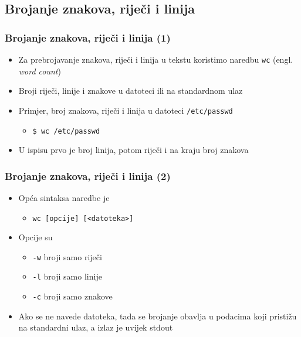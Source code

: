 \documentclass{beamer}
\newcommand{\shell}[1]{\texttt{#1}}
\begin{document}
\subsection{Brojanje znakova, riječi i linija}
\begin{frame}[t]
\frametitle{Brojanje znakova, riječi i linija (1)}
\begin{itemize}
  \item Za prebrojavanje znakova, riječi i linija u tekstu koristimo
        naredbu \shell{wc} (engl. \emph{word count})
  \item Broji riječi, linije i znakove u datoteci ili na standardnom ulaz
  \item Primjer, broj znakova, riječi i linija u datoteci
        \shell{/etc/passwd}
  \begin{itemize}
    \item[] \shell{\$ wc /etc/passwd}
  \end{itemize}
  \item U ispisu prvo je broj linija, potom riječi i na kraju broj znakova
\end{itemize}
\end{frame}

\begin{frame}[t]
\frametitle{Brojanje znakova, riječi i linija (2)}
\begin{itemize}
  \item Opća sintaksa naredbe je
  \begin{itemize}
    \item[] \shell{wc [opcije] [<datoteka>]}
  \end{itemize}
  \item Opcije su
  \begin{itemize}
    \item[] \shell{-w} broji samo riječi
    \item[] \shell{-l} broji samo linije
    \item[] \shell{-c} broji samo znakove
  \end{itemize}
  \item Ako se ne navede datoteka, tada se brojanje obavlja u podacima koji
        pristižu na standardni ulaz, a izlaz je uvijek stdout
\end{itemize}
\end{frame}
\end{document}
